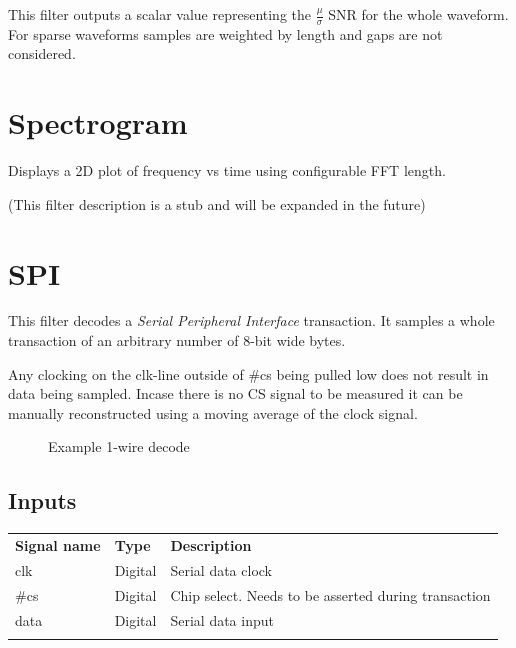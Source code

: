 This filter outputs a scalar value representing the $\frac{\mu}{\sigma}$ SNR for the whole waveform. For sparse
waveforms samples are weighted by length and gaps are not considered.

\pagebreak
\section{Spectrogram}

Displays a 2D plot of frequency vs time using configurable FFT length.

(This filter description is a stub and will be expanded in the future)

\pagebreak

\section{SPI}

This filter decodes a \textit{Serial Peripheral Interface} transaction.
It samples a whole transaction of an arbitrary number of 8-bit wide bytes.

Any clocking on the clk-line outside of \#cs being pulled low does not result
in data being sampled.
Incase there is no CS signal to be measured it can be manually reconstructed
using a moving average of the clock signal.

\begin{figure}[h]
\centering
{}
\caption{Example 1-wire decode}
\label{filter_1wire}
\end{figure}

\subsection{Inputs}

\begin{tabularx}{16cm}{llX}
\thickhline
\textbf{Signal name} & \textbf{Type} & \textbf{Description} \\
\thickhline
clk & Digital & Serial data clock \\
\thinhline
\#cs & Digital & Chip select. Needs to be asserted during transaction \\
\thinhline
data & Digital & Serial data input \\
\thickhline
\end{tabularx}

